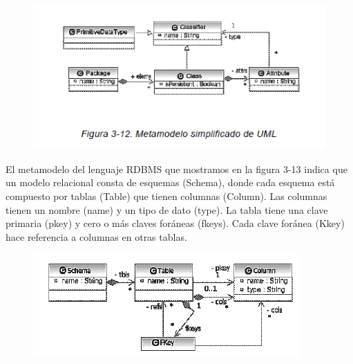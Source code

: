 \begin{figure}[H]
\centering
\includegraphics[scale=0.9]{./Imagenes/modelo17}
\end{figure}

El metamodelo del lenguaje RDBMS que mostramos en la figura 3-13
indica que un modelo relacional consta de esquemas (Schema), donde
cada esquema está compuesto por tablas (Table) que tienen columnas
(Column). Las columnas tienen un nombre (name) y un tipo de dato
(type). La tabla tiene una clave primaria (pkey) y cero o más claves
foráneas (fkeys). Cada clave foránea (Kkey) hace referencia a columnas
en otras tablas.

\begin{figure}[H]
\centering
\includegraphics[scale=0.9]{./Imagenes/modelo18}
\end{figure}

